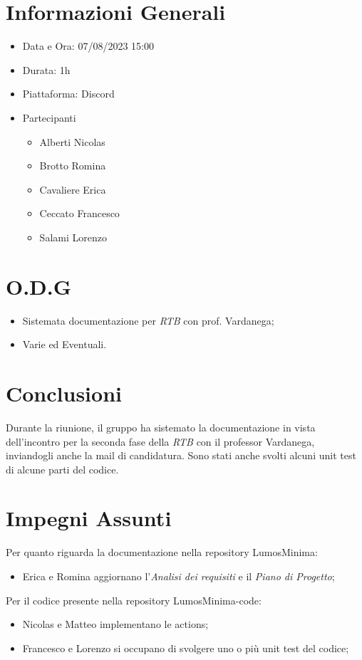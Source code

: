 \documentclass[a4paper, 12pt]{article}
\begin{document}
\makefrontpage

\section*{Informazioni Generali}
\begin{itemize}
    \item Data e Ora: 07/08/2023 15:00
    \item Durata: 1h
    \item Piattaforma: Discord
    \item Partecipanti
    \begin{itemize}
        \item Alberti Nicolas
        \item Brotto Romina
        \item Cavaliere Erica
        \item Ceccato Francesco
        \item Salami Lorenzo
    \end{itemize}
\end{itemize}

\section*{O.D.G}
\begin{itemize}
    \item Sistemata documentazione per \textit{RTB} con prof. Vardanega;
    \item Varie ed Eventuali.
\end{itemize}

\section*{Conclusioni}
Durante la riunione, il gruppo ha sistemato la documentazione in vista dell'incontro per la seconda fase della \textit{RTB} con il professor Vardanega, inviandogli anche la mail di candidatura.\newline
Sono stati anche svolti alcuni unit test di alcune parti del codice.

\section*{Impegni Assunti}

Per quanto riguarda la documentazione nella repository LumosMinima:
\begin{itemize}
    \item Erica e Romina aggiornano l'\textit{Analisi dei requisiti} e il \textit{Piano di Progetto};
\end{itemize}

Per il codice presente nella repository LumosMinima-code:
\begin{itemize}
    \item Nicolas e Matteo implementano le actions;
    \item Francesco e Lorenzo si occupano di svolgere uno o più unit test del codice;
\end{itemize}
\end{document}
